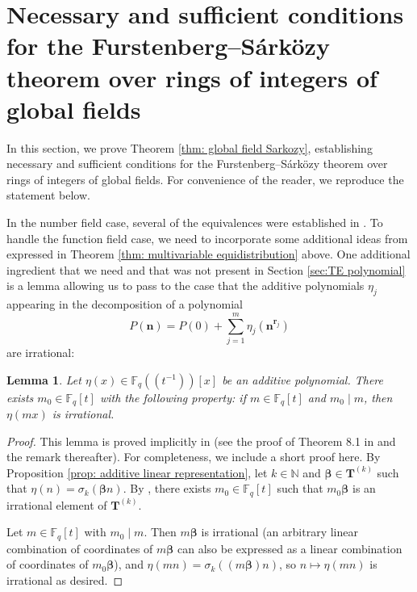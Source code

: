 \documentclass{amsart}
\newtheorem{lemma}[theorem]{Lemma}
\theoremstyle{definition}
\numberwithin{equation}{section}
\newcommand{\N}{\mathbb{N}}
\newcommand{\F}{\mathbb{F}}
\begin{document}

\section{Necessary and sufficient conditions for the Furstenberg--S\'{a}rk\"{o}zy theorem over rings of integers of global fields} \label{sec:nec/suff}

In this section, we prove Theorem \ref{thm: global field Sarkozy}, establishing necessary and sufficient conditions for the Furstenberg--S\'{a}rk\"{o}zy theorem over rings of integers of global fields.
For convenience of the reader, we reproduce the statement below.

\NecessarySufficient*

In the number field case, several of the equivalences were established in \cite{br}.
To handle the function field case, we need to incorporate some additional ideas from \cite{bl} expressed in Theorem \ref{thm: multivariable equidistribution} above.
One additional ingredient that we need and that was not present in Section \ref{sec:TE polynomial} is a lemma allowing us to pass to the case that the additive polynomials $\eta_j$ appearing in the decomposition of a polynomial
\begin{equation*}
    P(\bm{n}) = P(0) + \sum_{j=1}^m \eta_j(\bm{n}^{\bm{r}_j})
\end{equation*}
are irrational:

\begin{lemma} \label{lem: clear denominators}
    Let $\eta(x) \in \F_q((t^{-1}))[x]$ be an additive polynomial.
    There exists $m_0 \in \F_q[t]$ with the following property: if $m \in \F_q[t]$ and $m_0 \mid m$, then $\eta(mx)$ is irrational.
\end{lemma}

\begin{proof}
    This lemma is proved implicitly in \cite{bl} (see the proof of Theorem 8.1 in \cite{bl} and the remark thereafter).
    For completeness, we include a short proof here.
    By Proposition \ref{prop: additive linear representation}, let $k \in \N$ and $\bm{\beta} \in \mathbf{T}^{(k)}$ such that $\eta(n) = \sigma_k(\bm{\beta} n)$.
    By \cite[Lemma 4.1]{bl}, there exists $m_0 \in \F_q[t]$ such that $m_0 \bm{\beta}$ is an irrational element of $\mathbf{T}^{(k)}$.

    Let $m \in \F_q[t]$ with $m_0 \mid m$.
    Then $m\bm{\beta}$ is irrational (an arbitrary linear combination of coordinates of $m\bm{\beta}$ can also be expressed as a linear combination of coordinates of $m_0\bm{\beta}$), and $\eta(mn) = \sigma_k((m\bm{\beta})n)$, so $n \mapsto \eta(mn)$ is irrational as desired.
\end{proof}
\end{document}
